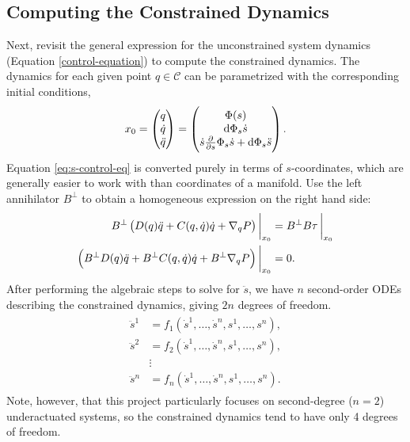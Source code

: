 \documentclass[main.tex]{subfiles}
\begin{document}
\subsection{Computing the Constrained Dynamics}
Next, revisit the general expression for the unconstrained system dynamics (Equation \ref{control-equation}) to compute the constrained dynamics. 
The dynamics for each given point $q\in\mathcal{C}$ can be parametrized with the corresponding initial conditions,
\begin{align}
x_0=\pmqty{q\\\qd\\\qdd}=\pmqty{
\Phi(s)\\
\dd\Phi_s\dot{s}\\
\dot{s}\pdv{}{s}\Phi_s\dot{s}+\dd\Phi_s\ddot{s}
}.
\end{align}
Equation \ref{eq:s-control-eq} is converted purely in terms of $s$-coordinates, which are generally easier to work with than coordinates of a manifold.
Use the left annihilator $B^\bot$ to obtain a homogeneous expression on the right hand side:
\begin{align}
B^\bot\del{
D(q)\qdd+C(q,\qd)\qd+\nabla_q P
}
\bigg|_{x_0}
&=B^\bot B\tau \,
\bigg|_{x_0}\label{eq:s-control-eq}\\
\del{B^\bot D(q)\qdd+ B^\bot C(q,\qd)\qd+ B^\bot\nabla_q P}\bigg|_{x_0}
&=0.
\end{align}
After performing the algebraic steps to solve for $\ddot s$, we have $n$ second-order ODEs describing the constrained dynamics, giving $2n$ degrees of freedom. 
\begin{align}
\begin{aligned}
\ddot s^1 &=f_1(\dot s^1,\ldots, \dot s^n, s^1,\ldots, s^n), \\ 
\ddot s^2 &=f_2(\dot s^1,\ldots, \dot s^n, s^1,\ldots, s^n),\\
&\vdots\phantom{={}}\\
\ddot s^n &=f_n(\dot s^1,\ldots, \dot s^n, s^1,\ldots, s^n).
\end{aligned}\label{eq:constr-dyn}
\end{align}
Note, however, that this project particularly focuses on second-degree ($n=2$) underactuated systems, so the constrained dynamics tend to have only 4 degrees of freedom.
\end{document}
